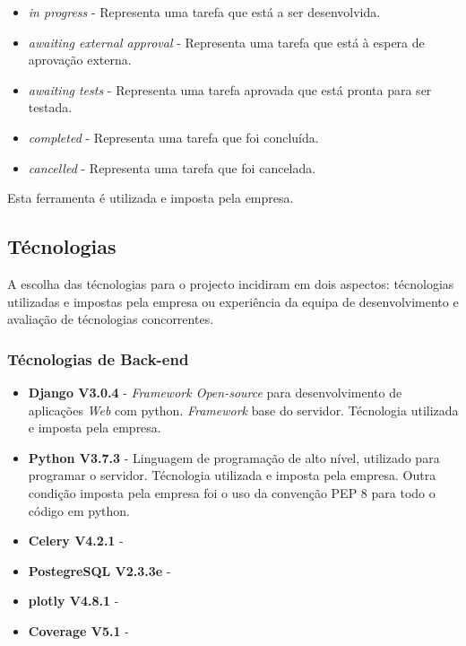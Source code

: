 \begin{itemize}
\begin{itemize}
		\item \textit{in progress} - Representa uma tarefa que está a ser desenvolvida.
		\item \textit{awaiting external approval} - Representa uma tarefa que está à espera de aprovação externa.
		\item \textit{awaiting tests} - Representa uma tarefa aprovada que está pronta para ser testada.
		\item \textit{completed} - Representa uma tarefa que foi concluída.
		\item \textit{cancelled} - Representa uma tarefa que foi cancelada.
	\end{itemize}
	 Esta ferramenta é utilizada e imposta pela empresa. 
\end{itemize}


\subsection{Técnologias}

A escolha das técnologias para o projecto incidiram em dois aspectos: técnologias utilizadas e impostas pela empresa ou experiência da equipa de desenvolvimento e avaliação de técnologias concorrentes.

\subsubsection{Técnologias de Back-end}
\begin{itemize}
	\item \textbf{Django V3.0.4} - \textit{Framework Open-source} para desenvolvimento de aplicações \textit{Web} com python. \textit{Framework} base do servidor. Técnologia utilizada e imposta pela empresa.
	\item \textbf{Python V3.7.3} - Linguagem de programação de alto nível, utilizado para programar o servidor. Técnologia utilizada e imposta pela empresa. Outra condição imposta pela empresa foi o uso da convenção PEP 8\cite{convencao} para todo o código em python.
	\item \textbf{Celery V4.2.1} - 
	\item \textbf{PostegreSQL V2.3.3e} - 
	\item \textbf{plotly V4.8.1} - 
	\item \textbf{Coverage V5.1} - 
\end{itemize}

